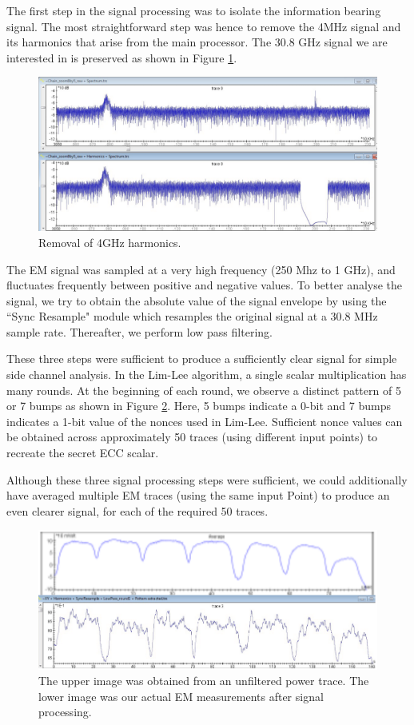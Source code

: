 
The first step in the signal processing was to isolate the information bearing signal. The most straightforward step was hence to remove the 4MHz signal and its harmonics that arise from the main processor. The 30.8 GHz signal we are interested in is preserved as shown in Figure \ref{figure:harmonics_removal}.

    \begin{figure}
      \centering
      \includegraphics[scale=0.3]{img/harmonics_removal.png}
      \caption{\label{figure:harmonics_removal}Removal of 4GHz harmonics.}
    \end{figure}  

The EM signal was sampled at a very high frequency (250 Mhz to 1 GHz), and fluctuates frequently between positive and negative values. To better analyse the signal, we try to obtain the absolute value of the signal envelope by using the ``Sync Resample" module which  resamples the original signal at a 30.8 MHz sample rate. Thereafter, we perform low pass filtering. 

These three steps were sufficient to produce a sufficiently clear signal for simple side channel analysis. In the Lim-Lee algorithm, a single scalar multiplication has many rounds. At the beginning of each round, we observe a distinct pattern of 5 or 7 bumps as shown in Figure \ref{figure:pattern}. Here, 5 bumps indicate a 0-bit and 7 bumps indicates a 1-bit value of the nonces used in Lim-Lee. Sufficient nonce values can be obtained across approximately 50 traces (using different input points) to recreate the secret ECC scalar.

Although these three signal processing steps were sufficient, we could additionally have averaged multiple EM traces (using the same  input Point) to produce an even clearer signal, for each of the required 50 traces.

    \begin{figure}
      \centering
      \includegraphics[scale=0.3]{img/pattern.png}
      \caption{\label{figure:pattern}The upper image was obtained from an unfiltered power trace. The lower image was our actual EM measurements after signal processing.}
    \end{figure}  



